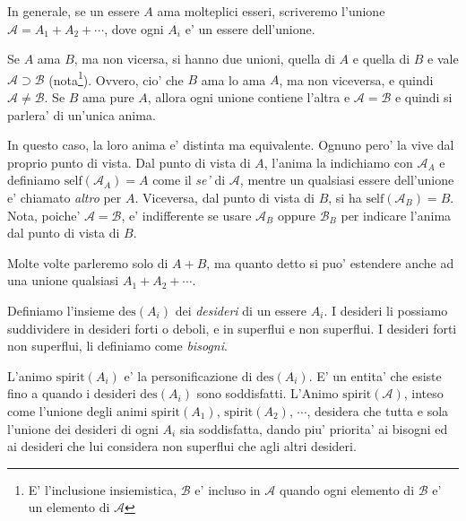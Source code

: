 In generale, se un essere $A$ ama molteplici esseri, scriveremo l'unione $\mathcal{A}=A_1+A_2+\cdots$, dove ogni $A_i$ e' un essere dell'unione.

\def\self{\textrm{self}}
\def\other{\textrm{other}}

Se $A$ ama $B$, ma non vicersa, si hanno due unioni, quella di $A$ e quella di $B$ e vale $\mathcal{A} \supset \mathcal{B}$ (nota\footnote{E' l'inclusione insiemistica, $\mathcal{B}$ e' incluso in $\mathcal{A}$ quando ogni elemento di $\mathcal{B}$ e' un elemento di $\mathcal{A}$}).  Ovvero, cio' che $B$ ama lo ama $A$, ma non viceversa, e quindi $\mathcal{A} \neq \mathcal{B}$. Se $B$ ama pure $A$, allora ogni unione contiene l'altra e $\mathcal{A} = \mathcal{B}$ e quindi si parlera' di un'unica anima. 

In questo caso, la loro anima e' distinta ma equivalente.  Ognuno pero' la vive dal proprio punto di vista. Dal punto di vista di $A$, l'anima la indichiamo con $\mathcal{A}_A$ e definiamo $\textrm{self}(\mathcal{A}_A)=A$ come il \emph{se'} di $\mathcal{A}$, mentre un qualsiasi essere dell'unione e' chiamato \emph{altro} per $A$. Viceversa, dal punto di vista di $B$, si ha $\textrm{self}(\mathcal{A}_B)=B$. Nota, poiche' $\mathcal{A}=\mathcal{B}$, e' indifferente se usare $\mathcal{A}_B$ oppure $\mathcal{B}_B$ per indicare l'anima dal punto di vista di $B$.

Molte volte parleremo solo di $A+B$, ma quanto detto si puo' estendere anche ad una unione qualsiasi $A_1+A_2+\cdots$. \\

\def\des{\textrm{des}}

Definiamo l'insieme $\des(A_i)$ dei \emph{desideri} di un essere $A_i$. I desideri li possiamo suddividere in desideri forti o deboli, e in superflui e non superflui. I desideri forti non superflui, li definiamo come \emph{bisogni}.

\def\anima#1{\mathcal{#1}}

\def\spirit#1{\textrm{spirit}(#1)}
\def\Animo#1{\spirit{\anima{#1}}}

L'animo $\spirit{A_i}$ e' la personificazione di $\des(A_i)$. E' un entita' che esiste fino a quando i desideri $\des(A_i)$ sono soddisfatti. L'Animo $\Animo{A}$, inteso come l'unione degli animi $\spirit{A_1}$, $\spirit{A_2}$, $\cdots$,  desidera che tutta e sola l'unione dei desideri di ogni $A_i$ sia soddisfatta, dando piu' priorita' ai bisogni ed ai desideri che lui considera non superflui che agli altri desideri.

